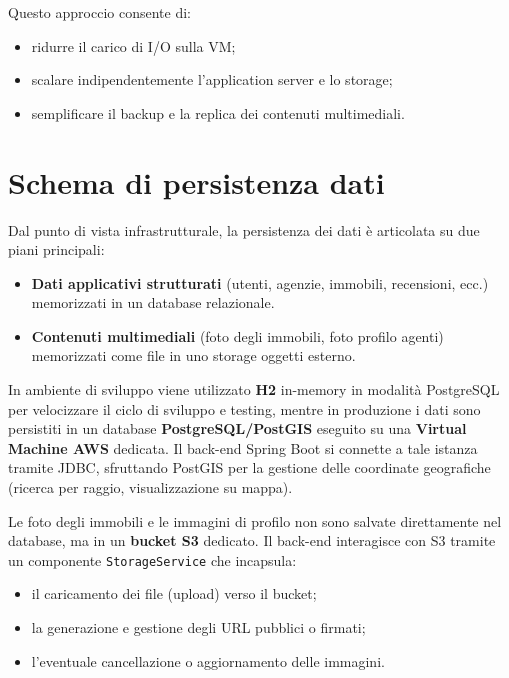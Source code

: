 \documentclass[a4paper,11pt]{report}
\begin{document}
Questo approccio consente di:

\begin{itemize}[nosep]
  \item ridurre il carico di I/O sulla VM;
  \item scalare indipendentemente l'application server e lo storage;
  \item semplificare il backup e la replica dei contenuti multimediali.
\end{itemize}

\pagebreak

\section{Schema di persistenza dati}

Dal punto di vista infrastrutturale, la persistenza dei dati è articolata su due piani principali:

\begin{itemize}[nosep]
  \item \textbf{Dati applicativi strutturati} (utenti, agenzie, immobili, recensioni, ecc.) memorizzati in un database relazionale.
  \item \textbf{Contenuti multimediali} (foto degli immobili, foto profilo agenti) memorizzati come file in uno storage oggetti esterno.
\end{itemize}

In ambiente di sviluppo viene utilizzato \textbf{H2} in-memory in modalità PostgreSQL per velocizzare il ciclo di sviluppo e testing, mentre in produzione i dati sono persistiti in un database \textbf{PostgreSQL/PostGIS} eseguito su una \textbf{Virtual Machine AWS} dedicata. Il back-end Spring Boot si connette a tale istanza tramite JDBC, sfruttando PostGIS per la gestione delle coordinate geografiche (ricerca per raggio, visualizzazione su mappa).

Le foto degli immobili e le immagini di profilo non sono salvate direttamente nel database, ma in un \textbf{bucket S3} dedicato. Il back-end interagisce con S3 tramite un componente \texttt{StorageService} che incapsula:

\begin{itemize}[nosep]
  \item il caricamento dei file (upload) verso il bucket;
  \item la generazione e gestione degli URL pubblici o firmati;
  \item l’eventuale cancellazione o aggiornamento delle immagini.
\end{itemize}
\end{document}
